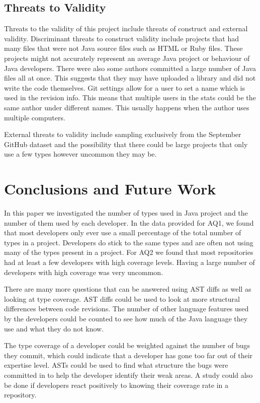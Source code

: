 \documentclass{sig-alternate-05-2015}
\begin{document}
\subsection{Threats to Validity}
Threats to the validity of this project include threats of construct and external validity. Discriminant threats to construct validity include projects that had many files that were not Java source files such as HTML or Ruby files. These projects might not accurately represent an average Java project or behaviour of Java developers. There were also some authors committed a large number of Java files all at once. This suggests that they may have uploaded a library and did not write the code themselves. Git settings allow for a user to set a name which is used in the revision info. This means that multiple users in the stats could be the same author under different names. This usually happens when the author uses multiple computers.

External threats to validity include sampling exclusively from the September GitHub dataset and the possibility that there could be large projects that only use a few types however uncommon they may be.

\section{Conclusions and Future Work}
In this paper we investigated the number of types used in Java project and the number of them used by each developer. In the data provided for AQ1, we found that most developers only ever use a small percentage of the total number of types in a project. Developers do stick to the same types and are often not using many of the types present in a project. For AQ2 we found that most repositories had at least a few developers with high coverage levels. Having a large number of developers with high coverage was very uncommon.

There are many more questions that can be answered using AST diffs as well as looking at type coverage. AST diffs could be used to look at more structural differences between code revisions. The number of other language features used by the developers could be counted to see how much of the Java language they use and what they do not know.

The type coverage of a developer could be weighted against the number of bugs they commit, which could indicate that a developer has gone too far out of their expertise level. ASTs could be used to find what structure the bugs were committed in to help the developer identify their weak areas. A study could also be done if developers react positively to knowing their coverage rate in a repository.
\end{document}
